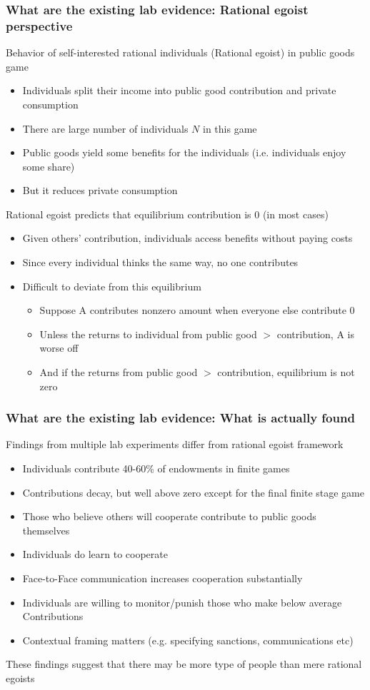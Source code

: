 \documentclass[aspectratio=169]{beamer}
\begin{document}
\begin{frame}
\frametitle{What are the existing lab evidence: Rational egoist perspective}
Behavior of self-interested rational individuals (Rational egoist) in public goods game
\begin{itemize}\setlength\itemsep{3pt}
  \item Individuals split their income into public good contribution and private consumption
  \item There are large number of individuals $N$ in this game
  \item Public goods yield some benefits for the individuals (i.e. individuals enjoy some share)
  \item But it reduces private consumption
\end{itemize}\medskip
Rational egoist predicts that equilibrium contribution is 0 (in most cases)
\begin{itemize}\setlength\itemsep{3pt}
  \item Given others' contribution, individuals access benefits without paying costs
  \item Since every individual thinks the same way, no one contributes
  \item Difficult to deviate from this equilibrium
  \begin{itemize}\setlength\itemsep{3pt}
  \item Suppose A contributes nonzero amount when everyone else contribute 0
  \item Unless the returns to individual from public good $>$ contribution, A is worse off
  \item And if the returns from public good $>$ contribution, equilibrium is not zero
\end{itemize}
\end{itemize}
\end{frame}

\begin{frame}
\frametitle{What are the existing lab evidence: What is actually found}
Findings from multiple lab experiments differ from rational egoist framework
\begin{itemize}\setlength\itemsep{3pt}
  \item Individuals contribute 40-60\% of endowments in finite games
  \item Contributions decay, but well above zero except for the final finite stage game
  \item Those who believe others will cooperate contribute to public goods themselves
  \item Individuals do learn to cooperate
  \item Face-to-Face communication increases cooperation substantially
  \item Individuals are willing to monitor/punish those who make below average Contributions
  \item Contextual framing matters (e.g. specifying sanctions, communications etc) 
\end{itemize} \medskip
These findings suggest that there may be more type of people than mere rational egoists
\end{frame}
\end{document}
